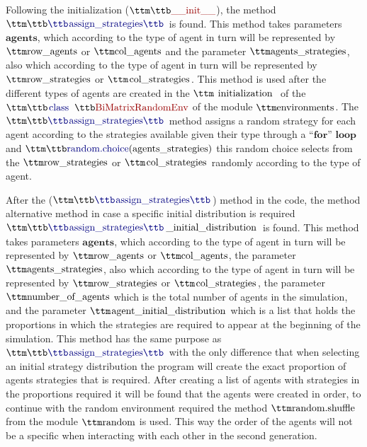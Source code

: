 Following the initialization ($\pythoninline{\_\_init\_\_}$), the method $\pythoninline{assign\_strategies}$ is found. This method takes parameters $\textbf{agents}$, which according to the type of agent in turn will be represented by $\pythoninline{row\_agents}$ or $\pythoninline{col\_agents}$  and the parameter $\pythoninline{agents\_strategies}$, also which according to the type of agent in turn will be represented by $\pythoninline{row\_strategies}$ or $\pythoninline{col\_strategies}$. This method is used after the different types of agents are created in the $\pythoninline{initialization}$ of the $\pythoninline{class BiMatrixRandomEnv}$ of the module $\pythoninline{environments}$. The $\pythoninline{assign\_strategies}$ method assigns a random strategy for each agent according to the strategies available given their type through a $\textbf{``for'' loop}$ and $\pythoninline{random.choice(agents\_strategies)}$ this random choice selects from the $\pythoninline{row\_strategies}$ or $\pythoninline{col\_strategies}$ randomly according to the type of agent.

After the ($\pythoninline{assign\_strategies}$) method in the code, the method alternative method in case a specific initial distribution is required  $\pythoninline{assign\_strategies\_initial\_distribution}$ is found. This method takes parameters $\textbf{agents}$, which according to the type of agent in turn will be represented by $\pythoninline{row\_agents}$ or $\pythoninline{col\_agents}$, the parameter $\pythoninline{agents\_strategies}$, also which according to the type of agent in turn will be represented by $\pythoninline{row\_strategies}$ or $\pythoninline{col\_strategies}$, the parameter $\pythoninline{number\_of\_agents}$ which is the total number of agents in the simulation, and the parameter $\pythoninline{agent\_initial\_distribution}$ which is a list that holds the proportions in which the strategies are required to appear at the beginning of the simulation. This method has the same purpose as $\pythoninline{assign\_strategies}$ with the only difference that when selecting an initial strategy distribution the program will create the exact proportion of agents strategies that is required. After creating a list of agents with strategies in the proportions required it will be found that the agents were created in order, to continue with the random environment required the method $\pythoninline{random.shuffle}$ from the module $\pythoninline{random}$ is used. This way the order of the agents will not be a specific when interacting with each other in the second generation.

